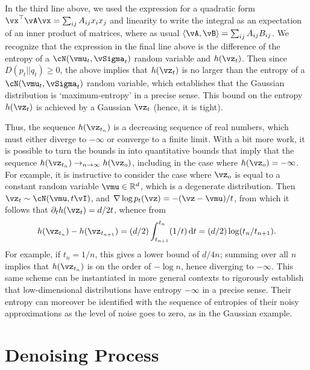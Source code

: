 \documentclass[../../book-main.tex]{subfiles}
\begin{document}
\begin{remark}
  In the third line above, we used the expression for a quadratic form $\vx^\top
  \vA \vx = \sum_{ij} A_{ij} x_i x_j$ and linearity to write the integral as an
  expectation of an inner product of matrices, where as usual $\ip{\vA}{\vB}
  = \sum_{ij} A_{ij} B_{ij}$.
  We recognize that the expression in the final line above is the difference of
  the entropy of a $\cN(\vmu_t, \vSigma_t)$ random variable and $h(\vz_t)$.
  Then since $D(p_t || q_t) \geq 0$, the above implies that $h(\vz_t)$ is no
  larger than the entropy of a $\cN(\vmu_t, \vSigma_t)$ random variable, which
  establishes that the Gaussian distribution is `maximum-entropy' in a precise
  sense.
  This bound on the entropy $h(\vz_t)$ is achieved by a Gaussian $\vz_t$ (hence,
  it is tight).

  Thus, the sequence $h(\vz_{t_n})$ is a decreasing sequence of real numbers, which
  must either diverge to $-\infty$ or converge to a finite limit.
  With a bit more work, it is possible to turn the bounds in
   into quantitative bounds that imply that
  the sequence $h(\vz_{t_n}) \to_{n\to\infty} h(\vz_o)$, including in the case
  where $h(\vz_o) = -\infty$.
  For example, it is instructive to consider the case where $\vz_o$ is
  equal to a constant random variable $\vmu \in \R^d$, which is a degenerate
  distribution. Then $\vz_t \sim
  \cN(\vmu, t\vI)$, and $\nabla \log p_t(\vz) = -(\vz - \vmu)/t$,
  from which it follows that $\partial_t h(\vz_t) = d/2t$, whence from
  \begin{equation*}
    h(\vz_{t_n}) - h(\vz_{t_{n+1}}) = (d/2)\int_{t_{n+1}}^{t_{n}} (1/t) \odif t
    =
    (d/2) \log(t_{n} / t_{n+1}).
  \end{equation*}
  For example, if $t_n = 1/n$, this gives a lower bound of $d/4n$; summing over
  all $n$ implies that $h(\vz_{t_n})$ is on the order of $-\log n$, hence
  diverging to $-\infty$.
  This same scheme can be instantiated in more general contexts to rigorously
  establish that low-dimensional distributions have entropy $-\infty$ in
  a precise sense.
  Their entropy can moreover be identified with the sequence of
  entropies of their noisy approximations as the level of noise goes to zero, as
  in the Gaussian example.
\end{remark}


\section{Denoising Process}
\end{document}
